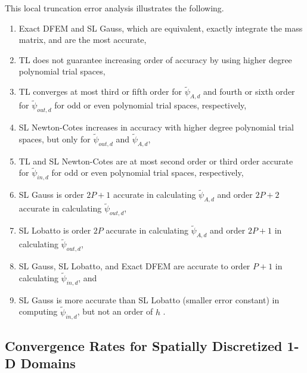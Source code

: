 This local truncation error analysis illustrates the following. 
\begin{enumerate}
\item Exact DFEM and SL Gauss, which are equivalent, exactly integrate the mass matrix, and are the most accurate,
\item TL does not guarantee increasing order of accuracy by using higher degree polynomial trial spaces,
\item TL converges at most third or fifth order for $\widetilde{\psi}_{A,d}$ and fourth or sixth order for $\widetilde{\psi}_{out,d}$ for odd or even polynomial trial spaces, respectively,
\item SL Newton-Cotes increases in accuracy with higher degree polynomial trial spaces, but only for $\widetilde{\psi}_{out,d}$ and $\widetilde{\psi}_{A,d}$,
\item TL and SL Newton-Cotes are at most second order or third order accurate for $\widetilde{\psi}_{in,d}$ for odd or even polynomial trial spaces, respectively, 
\item SL Gauss is order $2P+1$ accurate in calculating $\widetilde{\psi}_{A,d}$ and order $2P+2$ accurate in calculating $\widetilde{\psi}_{out,d}$,
\item SL Lobatto is order $2P$ accurate in calculating $\widetilde{\psi}_{A,d}$ and order $2P+1$ in calculating $\widetilde{\psi}_{out,d}$, 
\item SL Gauss, SL Lobatto, and Exact DFEM are accurate to order $P+1$ in calculating $\widetilde{\psi}_{in,d}$, and
\item SL Gauss is more accurate than SL Lobatto (smaller error constant) in computing $\widetilde{\psi}_{in,d}$, but not an order of $h$ .
\end{enumerate}

\subsection{Convergence Rates for Spatially Discretized 1-D Domains}
\label{sec:multi_cell}

